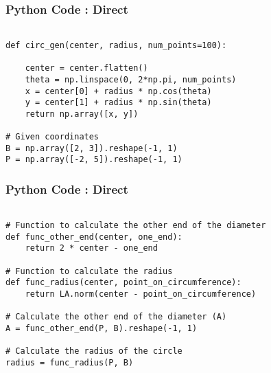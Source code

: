 \documentclass{beamer}
\begin{document}
\begin{frame}[fragile]
\frametitle{Python Code : Direct }

\begin{lstlisting}

def circ_gen(center, radius, num_points=100):
  
    center = center.flatten()
    theta = np.linspace(0, 2*np.pi, num_points)
    x = center[0] + radius * np.cos(theta)
    y = center[1] + radius * np.sin(theta)
    return np.array([x, y])

# Given coordinates
B = np.array([2, 3]).reshape(-1, 1)  
P = np.array([-2, 5]).reshape(-1, 1) 
\end{lstlisting}
\end{frame}

\begin{frame}[fragile]
\frametitle{Python Code : Direct }

\begin{lstlisting}

# Function to calculate the other end of the diameter
def func_other_end(center, one_end):
    return 2 * center - one_end

# Function to calculate the radius
def func_radius(center, point_on_circumference):
    return LA.norm(center - point_on_circumference)

# Calculate the other end of the diameter (A)
A = func_other_end(P, B).reshape(-1, 1)

# Calculate the radius of the circle
radius = func_radius(P, B)
\end{lstlisting}
\end{frame}
\end{document}
